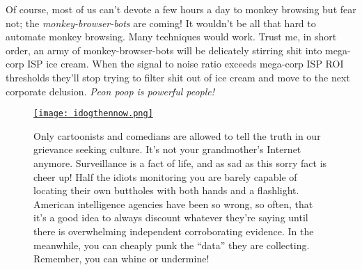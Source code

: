 Of course, most of us can't devote a few hours a day to monkey browsing
but fear not; the \emph{monkey-browser-bots} are coming! It wouldn't be
all that hard to automate monkey browsing. Many techniques would work.
Trust me, in short order, an army of monkey-browser-bots will be
delicately stirring shit into mega-corp ISP ice cream. When the signal
to noise ratio exceeds mega-corp ISP ROI thresholds they'll stop trying
to filter shit out of ice cream and move to the next corporate delusion.
\emph{Peon poop is powerful people!}

\captionsetup[figure]{labelformat=empty}
\begin{figure}[htbp]
\centering
\href{http://www.geekculture.com/joyoftech/joyarchives/1862.html}{\texttt{[image: idogthennow.png]}}
\caption{Only cartoonists and comedians are allowed to tell the truth in our grievance
seeking culture. It’s not your grandmother’s Internet anymore. Surveillance is a
fact of life, and as sad as this sorry fact is cheer up! Half the idiots monitoring
you are barely capable of locating their own buttholes with both hands and a flashlight.
American intelligence agencies have been so wrong, so often, that it’s a good
idea to always discount whatever they’re saying until there is overwhelming
independent corroborating evidence. In the meanwhile, you can 
cheaply punk the “data” they are collecting. Remember, you can whine or undermine!}
\label{fig:5358X0}
\end{figure}



%